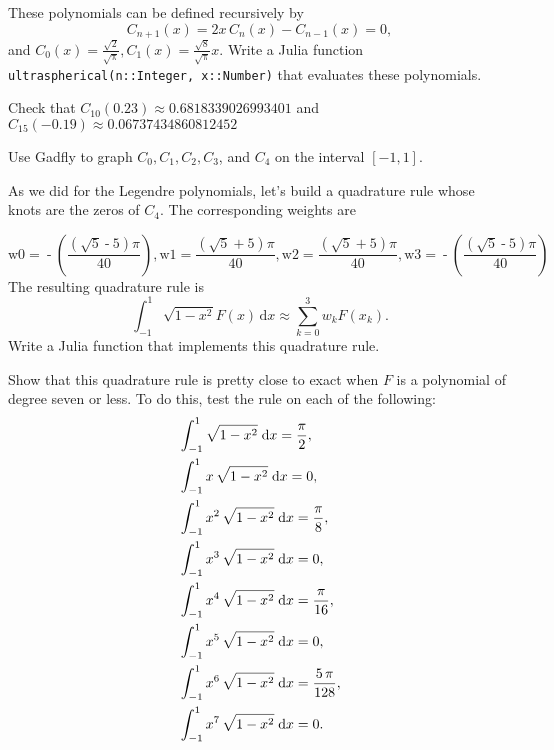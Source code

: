 \documentclass[12pt,fleqn]{exam}
\begin{document}
\begin{questions}

\question[10] These polynomials can be defined recursively by 
\begin{equation*}
 C_{n+1}(x) = 2  x \, C_n(x) - C_{n-1} (x) = 0,
\end{equation*}
and $C_0(x) = \frac{\sqrt{2}}{\sqrt{\uppi}},  C_1(x) = \frac{\sqrt{8}}{\sqrt{\uppi}} x$.  Write a Julia function \texttt{ ultraspherical(n::Integer, x::Number)}  that evaluates these polynomials. 



\question[10]  Check that $C_{10}(0.23) \approx 0.6818339026993401$  and  $C_{15}(-0.19) \approx 0.06737434860812452$

\question[10] Use Gadfly to graph $C_0, C_1, C_2, C_3$, and $C_4$ on the interval $[-1,1]$.


\question [10] As we did for the Legendre polynomials, let's build a quadrature rule whose knots are the zeros of $C_4$. The corresponding weights are

\begin{equation*}
 \ensuremath{\mathrm{w0}}\operatorname{=}\operatorname{-}\left( \frac{\left( \sqrt{5}\operatorname{-}5\right)  \ensuremath{\pi} }{40}\right) \operatorname{,}\ensuremath{\mathrm{w1}}\operatorname{=}\frac{\left( \sqrt{5}\operatorname{+}5\right)  \ensuremath{\pi} }{40}\operatorname{,}\ensuremath{\mathrm{w2}}\operatorname{=}\frac{\left( \sqrt{5}\operatorname{+}5\right)  \ensuremath{\pi} }{40}\operatorname{,}\ensuremath{\mathrm{w3}}\operatorname{=}\operatorname{-}\left( \frac{\left( \sqrt{5}\operatorname{-}5\right)  \ensuremath{\pi} }{40}\right) 
\end{equation*}
The resulting quadrature rule is
\begin{equation}
 \int_{-1}^1 \sqrt{1-x^2} F(x) \, \mathrm{d} x \approx \sum_{k=0}^3 w_k F(x_k).
\end{equation}
Write a Julia function that implements this quadrature rule.

\question [10] Show that this quadrature rule is pretty close to exact when $F$ is a polynomial of degree seven or less.  To do this, test the rule on each of the following:
\begin{align*}
&\int_{-1}^{1}{\sqrt{1-x^2}\;\mathrm{d}x}={{\pi}\over{2}} , \\
&\int_{-1 }^{1}{x\,\sqrt{1-x^2}\;\mathrm{d}x}=0 , \\
&\int_{-1}^{1}{x^2\,\sqrt{1-x^2}\;\mathrm{d}x}=  {{\pi}\over{8}} , \\
 &\int_{-1}^{1}{x^3\,\sqrt{1-x^2}\;\mathrm{d}x}=0 , \\
 &\int_{-1 }^{1}{x^4\,\sqrt{1-x^2}\;\mathrm{d}x}={{\pi}\over{16}} , \\
  &\int_{-1}^{1}{x^5\, \sqrt{1-x^2}\;\mathrm{d}x}=0 , \\
   &\int_{-1}^{1}{x^6\,\sqrt{1-x^2}\;\mathrm{d}x}={{5\,\pi  }\over{128}} , \\
   &\int_{-1}^{1}{x^7\,\sqrt{1-x^2}\;\mathrm{d}x}=0. 
 \end{align*}

\end{questions}
\end{document}
